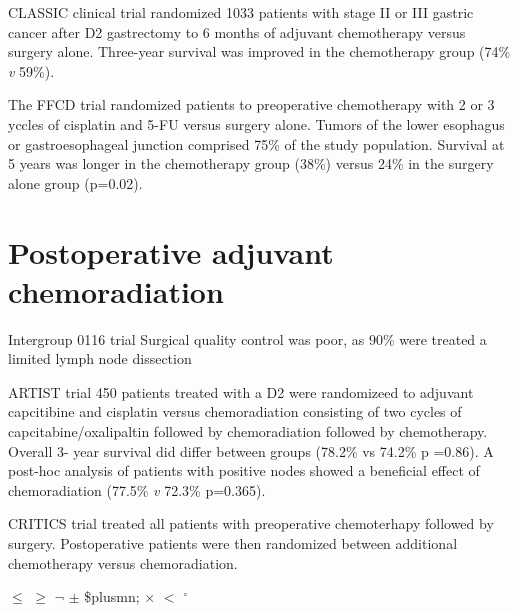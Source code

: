 \documentclass[
]{book}
\begin{document}
CLASSIC clinical trial randomized 1033 patients with stage II or III gastric cancer after D2 gastrectomy to 6 months of adjuvant chemotherapy versus surgery alone. Three-year survival was improved in the chemotherapy group (74\% \emph{v} 59\%).\citep{bang315}

The FFCD trial randomized patients to preoperative chemotherapy with 2 or 3 yccles of cisplatin and 5-FU versus surgery alone. Tumors of the lower esophagus or gastroesophageal junction comprised 75\% of the study population. Survival at 5 years was longer in the chemotherapy group (38\%) versus 24\% in the surgery alone group (p=0.02).\citep{ychou1715}

\hypertarget{postoperative-adjuvant-chemoradiation}{%
\chapter{Postoperative adjuvant chemoradiation}\label{postoperative-adjuvant-chemoradiation}}

Intergroup 0116 trial \citep{mcdonald725}
Surgical quality control was poor, as 90\% were treated a limited lymph node dissection

ARTIST trial 450 patients treated with a D2 were randomizeed to adjuvant capcitibine and cisplatin versus chemoradiation consisting of two cycles of capcitabine/oxalipaltin followed by chemoradiation followed by chemotherapy. Overall 3- year survival did differ between groups (78.2\% vs 74.2\% p =0.86). A post-hoc analysis of patients with positive nodes showed a beneficial effect of chemoradiation (77.5\% \emph{v} 72.3\% p=0.365).\citep{lee268}

CRITICS trial treated all patients with preoperative chemoterhapy followed by surgery. Postoperative patients were then randomized between additional chemotherapy versus chemoradiation.

\(\leq\)
\(\geq\)
\(\neg\)
\(\pm\) \$plusmn;
\(\times\)
\(<\)
\(^\circ\)

  
\end{document}
